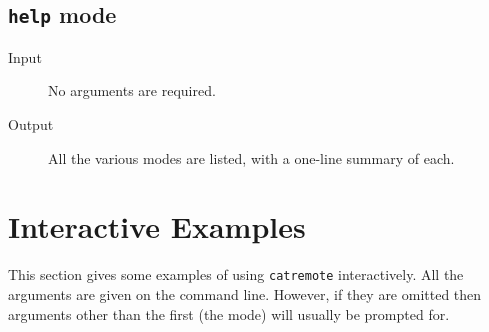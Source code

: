 \documentclass[twoside,11pt]{article}
\newcommand{\xlabel}[1]{}
\renewcommand{\_}{\texttt{\symbol{95}}}
\begin{document}
\subsection{{\tt help} mode}

\begin{description}

  \item[Input] No arguments are required.

  \item[Output] All the various modes are listed, with a one-line
   summary of each.

\end{description}


\section{\xlabel{I_EXAMPLES}\label{I_EXAMPLES}Interactive Examples}

This section gives some examples of using {\tt catremote} interactively.
All the arguments are given on the command line.  However, if they are
omitted then arguments other than the first (the mode) will usually be
prompted for.
\end{document}
